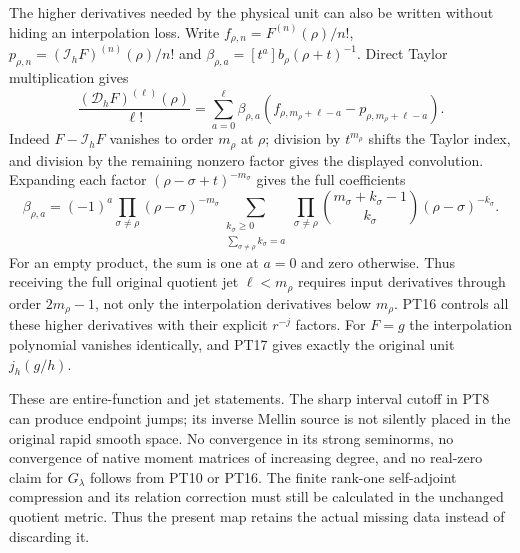 The higher derivatives needed by the physical unit can also be
written without hiding an interpolation loss. Write
$f_{\rho,n}=F^{(n)}(\rho)/n!$,
$p_{\rho,n}=(\mathcal I_hF)^{(n)}(\rho)/n!$ and
$\beta_{\rho,a}=[t^a]b_\rho(\rho+t)^{-1}$. Direct Taylor
multiplication gives
\begin{equation}\tag{PT17}
 \frac{(\mathcal D_hF)^{(\ell)}(\rho)}{\ell!}
   =\sum_{a=0}^{\ell}\beta_{\rho,a}
           (f_{\rho,m_\rho+\ell-a}-p_{\rho,m_\rho+\ell-a}).
\end{equation}
Indeed $F-\mathcal I_hF$ vanishes to order $m_\rho$ at
$\rho$; division by $t^{m_\rho}$ shifts the Taylor index, and
division by the remaining nonzero factor gives the displayed
convolution. Expanding each factor
$(\rho-\sigma+t)^{-m_\sigma}$ gives the full coefficients
\begin{equation}\tag{PT18}
 \beta_{\rho,a}=(-1)^a
   \prod_{\sigma\ne\rho}(\rho-\sigma)^{-m_\sigma}
   \sum_{\substack{k_\sigma\ge0\\\sum_{\sigma\ne\rho}k_\sigma=a}}
     \prod_{\sigma\ne\rho}
       \binom{m_\sigma+k_\sigma-1}{k_\sigma}
                      (\rho-\sigma)^{-k_\sigma}.
\end{equation}
For an empty product, the sum is one at $a=0$ and zero otherwise.
Thus receiving the full original quotient jet $\ell<m_\rho$
requires input derivatives through order $2m_\rho-1$, not only
the interpolation derivatives below $m_\rho$. PT16 controls all
these higher derivatives with their explicit $r^{-j}$ factors.
For $F=g$ the interpolation polynomial vanishes identically, and
PT17 gives exactly the original unit $j_h(g/h)$.

These are entire-function and jet statements. The sharp interval
cutoff in PT8 can produce endpoint jumps; its inverse Mellin
source is not silently placed in the original rapid smooth space.
No convergence in its strong seminorms, no convergence of native
moment matrices of increasing degree, and no real-zero claim for
$G_\lambda$ follows from PT10 or PT16. The finite rank-one
self-adjoint compression and its relation correction must still
be calculated in the unchanged quotient metric. Thus the present
map retains the actual missing data instead of discarding it.

